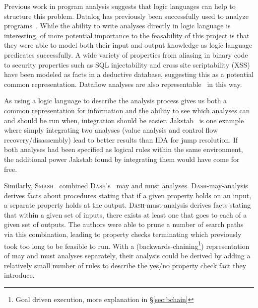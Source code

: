 Previous work in program analysis suggests that logic languages can help to structure this problem.
Datalog has previously been successfully used to analyze programs~\cite{Lam2005a, Brumley2006b, Alpuente2011, Smaragdakis, Whaley2007}.
While the ability to write analyses directly in logic language is interesting, of more potential importance to the feasability of this project is that they were able to model both their input and output knowledge as logic language predicates successfully.
A wide variety of properties from aliasing in binary code~\cite{Brumley2006b} to security properties such as SQL injectability and cross site scriptability (XSS)~\cite{Lam2005a} have been modeled as facts in a deductive database, suggesting this as a potential common representation.
Dataflow analyses are also representable~\cite{McAllester} in this way.

As using a logic language to describe the analysis process gives us both a common representation for information and the ability to see which analyses can and should be run when, integration should be easier.
Jakstab~\cite{jakstab} is one example where simply integrating two analyses (value analysis and control flow recovery/disassembly) lead to better results than IDA\cite{ida} for jump resolution.
If both analyses had been specified as logical rules within the same environment, the additional power Jakstab found by integrating them would have come for free.

Similarly, \textsc{Smash}~\cite{maymust} combined \textsc{Dash}'s~\cite{dash} may and must analyses.
\textsc{Dash}-may-analysis derives facts about procedures stating that if a given property holds on an input, a separate property holds at the output.
\textsc{Dash}-must-analysis derives facts stating that within a given set of inputs, there exists at least one that goes to each of a given set of outputs.
The authors were able to prune a number of search paths via this combination, leading to property checks terminating which previously took too long to be feasible to run.
With a (backwards-chaining\footnote{Goal driven execution, more explanation in \S\ref{sec:bchain}}) representation of may and must analyses separately, their analysis could be derived by adding a relatively small number of rules to describe the yes/no property check fact they introduce.

